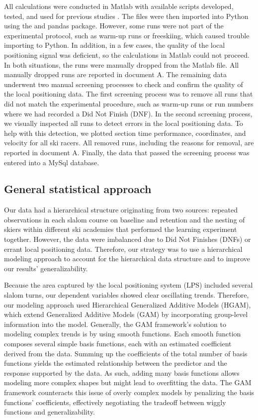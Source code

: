 \documentclass{article}
\begin{document}
All calculations were conducted in Matlab with available scripts developed, tested, and used for previous studies \cite{reidKinematicKineticStudy2010}. The files were then imported into Python using the  \cite{2020SciPy-NMeth} and pandas \cite{reback2020pandas} package. However, some runs were not part of the experimental protocol, such as warm-up runs or freeskiing, which caused trouble importing to Python. In addition, in a few cases, the quality of the local positioning signal was deficient, so the calculations in Matlab could not proceed. In both situations, the runs were manually dropped from the Matlab file. All manually dropped runs are reported in document A. The remaining data underwent two manual screening processes to check and confirm the quality of the local positioning data. The first screening process was to remove all runs that did not match the experimental procedure, such as warm-up runs or run numbers where we had recorded a Did Not Finish (DNF). In the second screening process, we visually inspected all runs to detect errors in the local positioning data. To help with this detection, we plotted section time performance, coordinates, and velocity for all ski racers. All removed runs, including the reasons for removal, are reported in document A. Finally, the data that passed the screening process was entered into a MySql database.


\subsection*{General statistical approach}

Our data had a hierarchical structure originating from two sources: repeated observations in each slalom course on baseline and retention and the nesting of skiers within different ski academies that performed the learning experiment together. However, the data were imbalanced due to Did Not Finishes (DNFs) or errant local positioning data. Therefore, our strategy was to use a hierarchical modeling approach to account for the hierarchical data structure and to improve our results' generalizability.

Because the area captured by the local positioning system (LPS) included several slalom turns, our dependent variables showed clear oscillating trends. Therefore, our modeling approach used Hierarchical Generalized Additive Models (HGAM), which extend Generalized Additive Models (GAM) by incorporating group-level information into the model. Generally, the GAM framework's solution to modeling complex trends is by using smooth functions. Each smooth function composes several simple basis functions, each with an estimated coefficient derived from the data. Summing up the coefficients of the total number of basis functions yields the estimated relationship between the predictor and the response supported by the data. As such, adding many basis functions allows modeling more complex shapes but might lead to overfitting the data. The GAM framework counteracts this issue of overly complex models by penalizing the basis functions' coefficients, effectively negotiating the tradeoff between wiggly functions and generalizability. 
\end{document}
